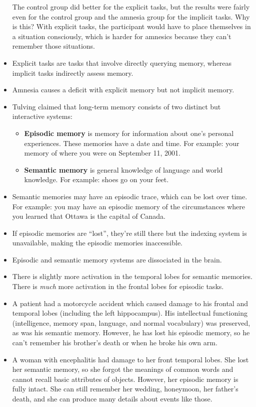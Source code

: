 \documentclass[]{article}
\begin{document}
\begin{itemize}
					The control group did better for the explicit tasks, but the results were fairly even for the control group and the amnesia group for the implicit tasks. Why is this? With explicit tasks, the participant would have to place themselves in a situation consciously, which is harder for amnesics because they can't remember those situations.
				\item Explicit tasks are tasks that involve directly querying memory, whereas implicit tasks indirectly assess memory.
				\item Amnesia causes a deficit with explicit memory but not implicit memory.
				\item Tulving claimed that long-term memory consists of two distinct but interactive systems:
					\begin{itemize}
						\item \textbf{Episodic memory} is memory for information about one's personal experiences. These memories have a date and time. For example: your memory of where you were on September 11, 2001.
						\item \textbf{Semantic memory} is general knowledge of language and world knowledge. For example: shoes go on your feet.
					\end{itemize}
				\item Semantic memories may have an episodic trace, which can be lost over time. For example: you may have an episodic memory of the circumstances where you learned that Ottawa is the capital of Canada.
				\item If episodic memories are ``lost'', they're still there but the indexing system is unavailable, making the episodic memories inaccessible.
				\item Episodic and semantic memory systems are dissociated in the brain.
				\item There is slightly more activation in the temporal lobes for semantic memories. There is \emph{much} more activation in the frontal lobes for episodic tasks.
				\item A patient had a motorcycle accident which caused damage to his frontal and temporal lobes (including the left hippocampus). His intellectual functioning (intelligence, memory span, language, and normal vocabulary) was preserved, as was his semantic memory. However, he has lost his episodic memory, so he can't remember his brother's death or when he broke his own arm.
				\item A woman with encephalitis had damage to her front temporal lobes. She lost her semantic memory, so she forgot the meanings of common words and cannot recall basic attributes of objects. However, her episodic memory is fully intact. She can still remember her wedding, honeymoon, her father's death, and she can produce many details about events like those.
			\end{itemize}
\end{document}
